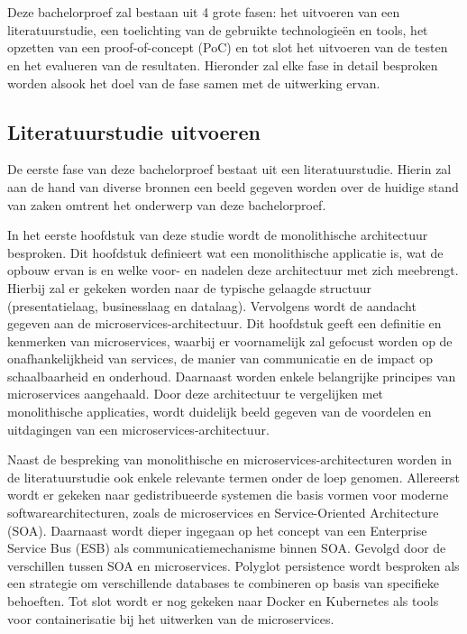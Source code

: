 
\chapter{}%
\label{ch:methodologie}

Deze bachelorproef zal bestaan uit 4 grote fasen: het uitvoeren van een literatuurstudie, een toelichting van de gebruikte technologieën en tools, het opzetten van een proof-of-concept (PoC) en tot slot het uitvoeren van de testen en het evalueren van de resultaten. Hieronder zal elke fase in detail besproken worden alsook het doel van de fase samen met de uitwerking ervan.

\section{Literatuurstudie uitvoeren}

De eerste fase van deze bachelorproef bestaat uit een literatuurstudie. Hierin zal aan de hand van diverse bronnen een beeld gegeven worden over de huidige stand van zaken omtrent het onderwerp van deze bachelorproef.\newline 

In het eerste hoofdstuk van deze studie wordt de monolithische architectuur besproken. Dit hoofdstuk definieert wat een monolithische applicatie is, wat de opbouw ervan is en welke voor- en nadelen deze architectuur met zich meebrengt. Hierbij zal er gekeken worden naar de typische gelaagde structuur (presentatielaag, businesslaag en datalaag). Vervolgens wordt de aandacht gegeven aan de microservices-architectuur. Dit hoofdstuk geeft een definitie en kenmerken van microservices, waarbij er voornamelijk zal gefocust worden op de onafhankelijkheid van services, de manier van communicatie en de impact op schaalbaarheid en onderhoud. Daarnaast worden enkele belangrijke principes van microservices aangehaald. Door deze architectuur te vergelijken met monolithische applicaties, wordt duidelijk beeld gegeven van de voordelen en uitdagingen van een microservices-architectuur.\newline

Naast de bespreking van monolithische en microservices-architecturen worden in de literatuurstudie ook enkele relevante termen onder de loep genomen. Allereerst wordt er gekeken naar gedistribueerde systemen die basis vormen voor moderne softwarearchitecturen, zoals de microservices en Service-Oriented Architecture (SOA). Daarnaast wordt dieper ingegaan op het concept van een Enterprise Service Bus (ESB) als communicatiemechanisme binnen SOA. Gevolgd door de verschillen tussen SOA en microservices. Polyglot persistence wordt besproken als een strategie om verschillende databases te combineren op basis van specifieke behoeften. Tot slot wordt er nog gekeken naar Docker en Kubernetes als tools voor containerisatie bij het uitwerken van de microservices.

